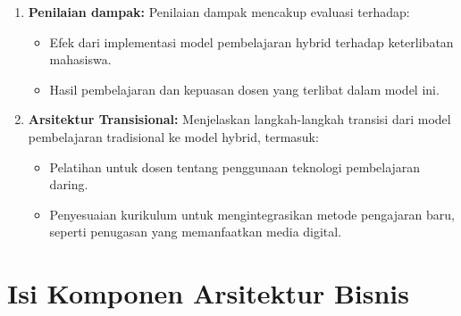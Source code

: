 \begin{enumerate}
	\item \textbf{Penilaian dampak:}  
	Penilaian dampak mencakup evaluasi terhadap:
	\begin{itemize}
		\item Efek dari implementasi model pembelajaran hybrid terhadap keterlibatan mahasiswa.
		\item Hasil pembelajaran dan kepuasan dosen yang terlibat dalam model ini.
	\end{itemize}
	
	\item \textbf{Arsitektur Transisional:}  
	Menjelaskan langkah-langkah transisi dari model pembelajaran tradisional ke model hybrid, termasuk:
	\begin{itemize}
		\item Pelatihan untuk dosen tentang penggunaan teknologi pembelajaran daring.
		\item Penyesuaian kurikulum untuk mengintegrasikan metode pengajaran baru, seperti penugasan yang memanfaatkan media digital.
	\end{itemize}
\end{enumerate}


\section{Isi Komponen Arsitektur Bisnis}
\label{sec:isi_komponen_arsitektur_bisnis}

